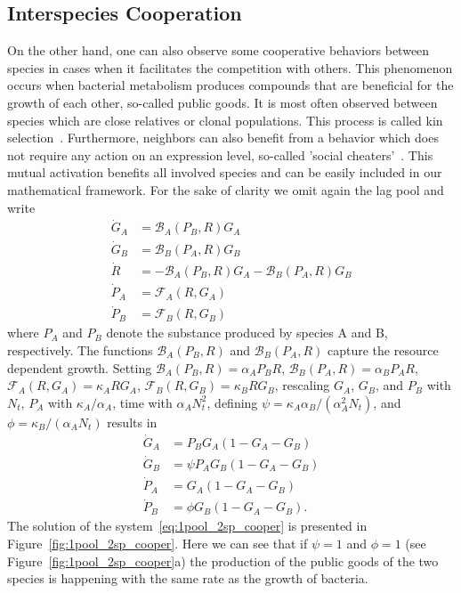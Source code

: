 \documentclass[10pt,twocolumn,5p]{elsarticle}
\numberwithin{equation}{section}
\begin{document}
\subsection{Interspecies Cooperation}
On the other hand, one can also observe some cooperative behaviors between species in cases when it facilitates the competition with others.
This phenomenon occurs when bacterial metabolism produces compounds that are beneficial for the growth of each other, so-called public goods.
It is most often observed between species which are close relatives or clonal populations.
This process is called kin selection~\cite{west_social_2007}.
Furthermore, neighbors can also benefit from a behavior which does not require any action on an expression level, so-called 'social cheaters'~\cite{rainey_evolution_2003}.
This mutual activation benefits all involved species and can be easily included in our mathematical framework.
For the sake of clarity we omit again the lag pool and write
\begin{align}
    \dot{G}_A &= \mathcal{B}_A(P_B,R)G_A\\
    \dot{G}_B &= \mathcal{B}_B(P_A,R)G_B\\
    \dot{R} &=-\mathcal{B}_A(P_B,R)G_A-\mathcal{B}_B(P_A,R)G_B\\
    \dot{P}_A &= \mathcal{F}_A(R,G_A)\\
    \dot{P}_B &= \mathcal{F}_B(R,G_B)
\end{align}
where $P_A$ and $P_B$ denote the substance produced by species A and B, respectively.
The functions $\mathcal{B}_A(P_B,R)$ and $\mathcal{B}_B(P_A,R)$ capture the resource dependent growth.
Setting $\mathcal{B}_A(P_B,R)=\alpha_A P_BR$, $\mathcal{B}_B(P_A,R)=\alpha_B P_A R$, $\mathcal{F}_A(R,G_A)=\kappa_A RG_A$, $\mathcal{F}_B(R,G_B)=\kappa_B RG_B$, rescaling $G_A$, $G_B$, and $P_B$ with $N_t$, $P_A$ with $\kappa_A/\alpha_A$, time with $\alpha_AN_t^2$, defining $\psi=\kappa_A\alpha_B/(\alpha_A^2N_t)$, and $\phi=\kappa_B/(\alpha_A N_t)$ results in
\begin{align}
    \dot{G}_A &= P_B G_A\left(1 - G_A-G_B\right)\\
    \dot{G}_B &= \psi P_A G_B\left(1 - G_A-G_B\right)\\
    \dot{P}_A &= G_A\left(1 - G_A-G_B\right)\\
    \dot{P}_B &=\phi G_B\left(1 - G_A-G_B\right).
    \label{eq:1pool_2sp_cooper}
\end{align}
%
The solution of the system~\ref{eq:1pool_2sp_cooper} is presented in Figure~\ref{fig:1pool_2sp_cooper}.
Here we can see that if $\psi=1$ and $\phi=1$ (see Figure~\ref{fig:1pool_2sp_cooper}a) the production of the public goods of the two species is happening with the same rate as the growth of bacteria.
\end{document}
